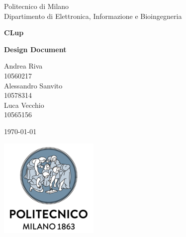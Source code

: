 \documentclass[10pt,english, openany]{book}
\begin{document}

\begin{titlepage}
	\clearpage\thispagestyle{empty}
	\centering
	\vspace{1cm}

	{\normalsize Politecnico di Milano\\
	             Dipartimento di Elettronica, Informazione e Bioingegneria \par}
		\vspace{2cm}
	{\Huge \textbf{CLup}
	} \\
	{\large \textbf{Design Document} \par}
	\vspace{4cm}
	{\normalsize Andrea Riva\\
	             10560217\\
	             Alessandro Sanvito\\ 
                 10578314\\
                 Luca Vecchio\\
                 10565156
                 \par}
	\vspace{5cm}
	
	{\normalsize \today \par}
	
	\vspace{0.5cm}
    
    \centering \includegraphics[scale=0.6]{logo1.png}
    
    
	\pagebreak

\end{titlepage}

\tableofcontents{}

\mainmatter
\end{document}
